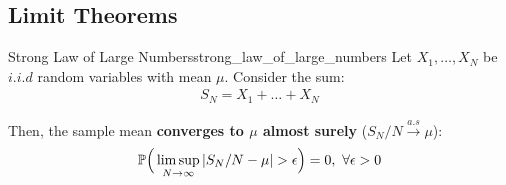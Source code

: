 \subsection{Limit Theorems}
\begin{theorem}{Strong Law of Large Numbers}{strong_law_of_large_numbers}
    Let $X_1, \dots, X_N$ be $i.i.d$ random variables with mean $\mu$. Consider the sum:
    \begin{align}
        S_N = X_1 + \dots + X_N
    \end{align}

    \noindent Then, the sample mean \textbf{converges to $\mu$ almost surely} ($S_N/N\xrightarrow{a.s}\mu$):
    \begin{align}
        \mathbb{P}\Big( 
            \limsup_{N\to\infty}|S_N/N - \mu| > \epsilon
         \Big) = 0, \ \forall \epsilon > 0
    \end{align}
\end{theorem}

